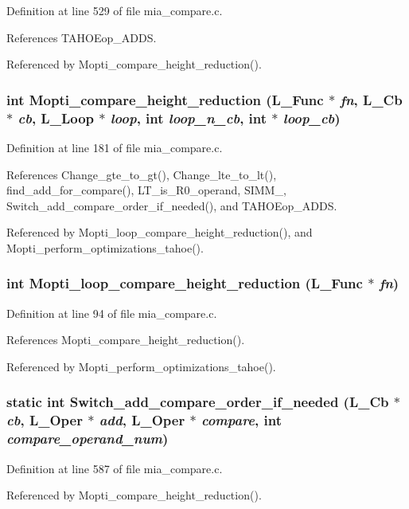 Definition at line 529 of file mia\_\-compare.c.

References TAHOEop\_\-ADDS.

Referenced by Mopti\_\-compare\_\-height\_\-reduction().
\subsubsection{\setlength{\rightskip}{0pt plus 5cm}int Mopti\_\-compare\_\-height\_\-reduction (L\_\-Func $\ast$ {\em fn}, L\_\-Cb $\ast$ {\em cb}, L\_\-Loop $\ast$ {\em loop}, int {\em loop\_\-n\_\-cb}, int $\ast$ {\em loop\_\-cb})}\label{mia__compare_8c_df58ac098e0582c80135d341848632ae}




Definition at line 181 of file mia\_\-compare.c.

References Change\_\-gte\_\-to\_\-gt(), Change\_\-lte\_\-to\_\-lt(), find\_\-add\_\-for\_\-compare(), LT\_\-is\_\-R0\_\-operand, SIMM\_, Switch\_\-add\_\-compare\_\-order\_\-if\_\-needed(), and TAHOEop\_\-ADDS.

Referenced by Mopti\_\-loop\_\-compare\_\-height\_\-reduction(), and Mopti\_\-perform\_\-optimizations\_\-tahoe().
\subsubsection{\setlength{\rightskip}{0pt plus 5cm}int Mopti\_\-loop\_\-compare\_\-height\_\-reduction (L\_\-Func $\ast$ {\em fn})}\label{mia__compare_8c_3a3e726604ae78872e340ee4c5a252f2}




Definition at line 94 of file mia\_\-compare.c.

References Mopti\_\-compare\_\-height\_\-reduction().

Referenced by Mopti\_\-perform\_\-optimizations\_\-tahoe().
\subsubsection{\setlength{\rightskip}{0pt plus 5cm}static int Switch\_\-add\_\-compare\_\-order\_\-if\_\-needed (L\_\-Cb $\ast$ {\em cb}, L\_\-Oper $\ast$ {\em add}, L\_\-Oper $\ast$ {\em compare}, int {\em compare\_\-operand\_\-num})\hspace{0.3cm}{\tt  [static]}}\label{mia__compare_8c_fb93bfeee41849274565e37a09c2169a}




Definition at line 587 of file mia\_\-compare.c.

Referenced by Mopti\_\-compare\_\-height\_\-reduction().